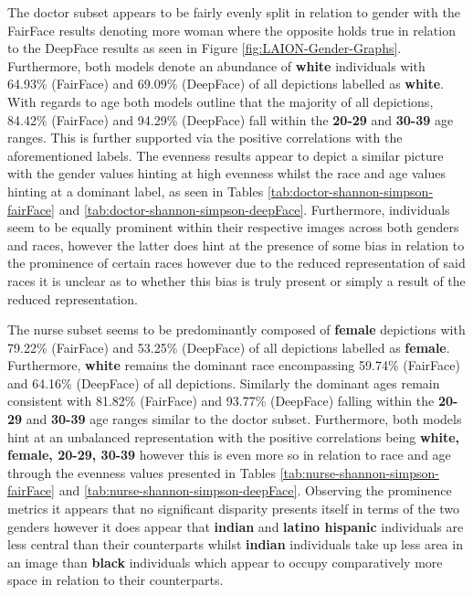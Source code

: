 The doctor subset appears to be fairly evenly split in relation to gender with the FairFace results denoting more woman where the opposite holds true in relation to the DeepFace results as seen in Figure \ref{fig:LAION-Gender-Graphs}. Furthermore, both models denote an abundance of \textbf{white} individuals with 64.93\% (FairFace) and 69.09\% (DeepFace) of all depictions labelled as \textbf{white}. With regards to age both models outline that the majority of all depictions, 84.42\% (FairFace) and 94.29\% (DeepFace) fall within the \textbf{20-29} and \textbf{30-39} age ranges. This is further supported via the positive correlations with the aforementioned labels. The evenness results appear to depict a similar picture with the gender values hinting at high evenness whilst the race and age values hinting at a dominant label, as seen in Tables \ref{tab:doctor-shannon-simpson-fairFace} and \ref{tab:doctor-shannon-simpson-deepFace}. Furthermore, individuals seem to be equally prominent within their respective images across both genders and races, however the latter does hint at the presence of some bias in relation to the prominence of certain races however due to the reduced representation of said races it is unclear as to whether this bias is truly present or simply a result of the reduced representation. 

The nurse subset seems to be predominantly composed of \textbf{female} depictions with 79.22\% (FairFace) and 53.25\% (DeepFace) of all depictions labelled as \textbf{female}. Furthermore, \textbf{white} remains the dominant race encompassing 59.74\% (FairFace) and 64.16\% (DeepFace) of all depictions. Similarly the dominant ages remain consistent with 81.82\% (FairFace) and 93.77\% (DeepFace) falling within the \textbf{20-29} and \textbf{30-39} age ranges similar to the doctor subset. Furthermore, both models hint at an unbalanced representation with the positive correlations being \textbf{white, female, 20-29, 30-39} however this is even more so in relation to race and age through the evenness values presented in Tables \ref{tab:nurse-shannon-simpson-fairFace} and \ref{tab:nurse-shannon-simpson-deepFace}. Observing the prominence metrics it appears that no significant disparity presents itself in terms of the two genders however it does appear that \textbf{indian} and \textbf{latino hispanic} individuals are less central than their counterparts whilst \textbf{indian} individuals take up less area in an image than \textbf{black} individuals which appear to occupy comparatively more space in relation to their counterparts.  

